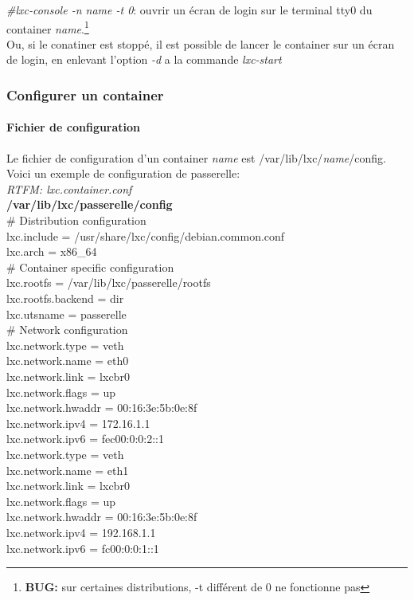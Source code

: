 \emph{\#lxc-console -n name -t 0}: ouvrir un \'ecran de login sur le terminal tty0 du container \emph{name}.\footnote{\textbf{BUG:} sur certaines distributions, -t diff\'erent de 0 ne fonctionne pas}\\
Ou, si le conatiner est stopp\'e, il est possible de lancer le container sur un \'ecran de login, en enlevant l'option \emph{-d} a la commande \emph{lxc-start}

\subsubsection{Configurer un container}
\paragraph{Fichier de configuration}
Le fichier de configuration d'un container \emph{name} est /var/lib/lxc/\emph{name}/config. Voici un exemple de configuration de passerelle:\\
\emph{RTFM: lxc.container.conf}\\

\noindent
\textbf{/var/lib/lxc/passerelle/config}\\

\noindent
\# Distribution configuration\\
lxc.include = /usr/share/lxc/config/debian.common.conf\\
lxc.arch = x86\_64\\

\noindent
\# Container specific configuration\\
lxc.rootfs = /var/lib/lxc/passerelle/rootfs\\
lxc.rootfs.backend = dir\\
lxc.utsname = passerelle\\

\noindent
\# Network configuration\\
lxc.network.type = veth\\
lxc.network.name = eth0\\
lxc.network.link = lxcbr0\\
lxc.network.flags = up\\
lxc.network.hwaddr = 00:16:3e:5b:0e:8f\\
lxc.network.ipv4 = 172.16.1.1\\
lxc.network.ipv6 = fec00:0:0:2::1\\

\noindent
lxc.network.type = veth\\
lxc.network.name = eth1\\
lxc.network.link = lxcbr0\\
lxc.network.flags = up\\
lxc.network.hwaddr = 00:16:3e:5b:0e:8f\\
lxc.network.ipv4 = 192.168.1.1\\
lxc.network.ipv6 = fc00:0:0:1::1\\

